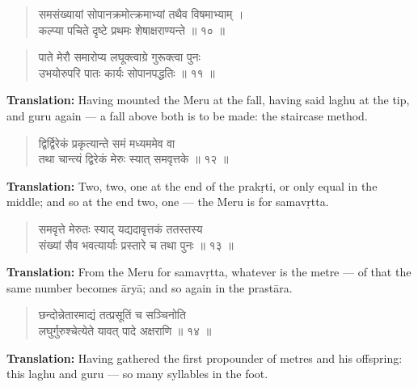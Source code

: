\documentclass[11pt,a4paper]{article}
\newenvironment{shloka}{\begin{verse}\devanagarifont\large}{\end{verse}}
\begin{document}
\begin{shloka}
समसंख्यायां सोपानक्रमोत्क्रमाभ्यां तथैव विषमाभ्याम् ।\\
कल्प्या पचिते दृष्टे प्रथमः शेषाक्षराण्यन्ते ॥ १० ॥
\end{shloka}

\vspace{0.3cm}

\begin{shloka}
पाते मेरौ समारोप्य लघूक्त्वाग्रे गुरूक्त्वा पुनः \\
उभयोरुपरि पातः कार्यः सोपानपद्धतिः ॥ ११ ॥
\end{shloka}

\textbf{Translation:}\quad
Having mounted the Meru at the fall, having said laghu at the tip,
and guru again — a fall above both is to be made: the staircase
method.

\vspace{0.3cm}

\begin{shloka}
द्विर्द्विरेकं प्रकृत्यान्ते समं मध्यममेव वा \\
तथा चान्त्यं द्विरेकं मेरुः स्यात् समवृत्तके ॥ १२ ॥
\end{shloka}

\textbf{Translation:}\quad
Two, two, one at the end of the prakṛti, or only equal in the middle;
and so at the end two, one — the Meru is for samavṛtta.

\vspace{0.3cm}

\begin{shloka}
समवृत्ते मेरुतः स्याद् यद्यदावृत्तकं ततस्तस्य \\
संख्यां सैव भवत्यार्याः प्रस्तारे च तथा पुनः ॥ १३ ॥
\end{shloka}

\textbf{Translation:}\quad
From the Meru for samavṛtta, whatever is the metre — of that the
same number becomes āryā; and so again in the prastāra.

\vspace{0.3cm}

\begin{shloka}
छन्दोन्नेतारमाद्यं तत्प्रसूतिं च सञ्चिनोति \\
लघुर्गुरुश्चेत्येते यावत् पादे अक्षराणि ॥ १४ ॥
\end{shloka}

\textbf{Translation:}\quad
Having gathered the first propounder of metres and his offspring:
this laghu and guru — so many syllables in the foot.
\end{document}

